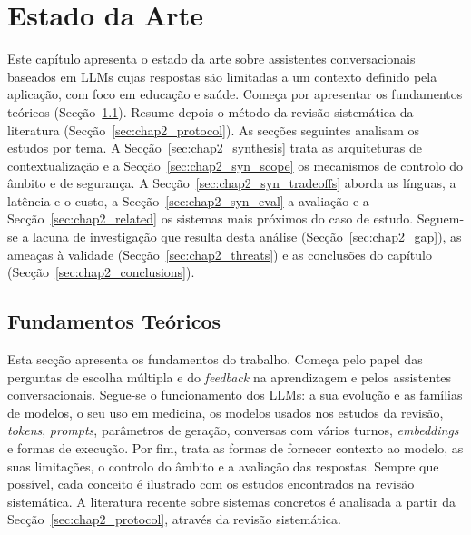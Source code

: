 
\chapter{Estado da Arte} %
\label{chap:Chapter2} %


Este capítulo apresenta o estado da arte sobre assistentes conversacionais baseados em \glspl{LLM} cujas respostas são limitadas a um contexto definido pela aplicação, com foco em educação e saúde. Começa por apresentar os fundamentos teóricos (Secção~\ref{sec:chap2_concepts}). Resume depois o método da revisão sistemática da literatura (Secção~\ref{sec:chap2_protocol}). As secções seguintes analisam os estudos por tema. A Secção~\ref{sec:chap2_synthesis} trata as arquiteturas de contextualização e a Secção~\ref{sec:chap2_syn_scope} os mecanismos de controlo do âmbito e de segurança. A Secção~\ref{sec:chap2_syn_tradeoffs} aborda as línguas, a latência e o custo, a Secção~\ref{sec:chap2_syn_eval} a avaliação e a Secção~\ref{sec:chap2_related} os sistemas mais próximos do caso de estudo. Seguem-se a lacuna de investigação que resulta desta análise (Secção~\ref{sec:chap2_gap}), as ameaças à validade (Secção~\ref{sec:chap2_threats}) e as conclusões do capítulo (Secção~\ref{sec:chap2_conclusions}).

\section{Fundamentos Teóricos}
\label{sec:chap2_concepts}

Esta secção apresenta os fundamentos do trabalho. Começa pelo papel das perguntas de escolha múltipla e do \emph{feedback} na aprendizagem e pelos assistentes conversacionais. Segue-se o funcionamento dos \glspl{LLM}: a sua evolução e as famílias de modelos, o seu uso em medicina, os modelos usados nos estudos da revisão, \emph{tokens}, \emph{prompts}, parâmetros de geração, conversas com vários turnos, \emph{embeddings} e formas de execução. Por fim, trata as formas de fornecer contexto ao modelo, as suas limitações, o controlo do âmbito e a avaliação das respostas. Sempre que possível, cada conceito é ilustrado com os estudos encontrados na revisão sistemática. A literatura recente sobre sistemas concretos é analisada a partir da Secção~\ref{sec:chap2_protocol}, através da revisão sistemática.

